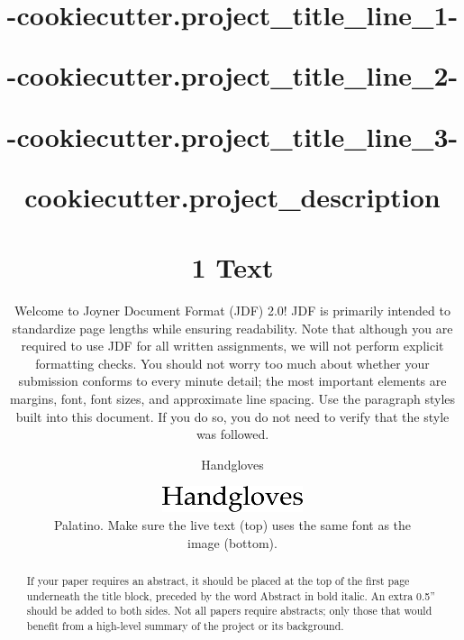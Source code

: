 

\title{
  {{-cookiecutter.project_title_line_1-}} \\

  {%
    {{-cookiecutter.project_title_line_2-}} \\
  {%

  {%
    {{-cookiecutter.project_title_line_3-}} \\
  {%
  }



\maketitle
\thispagestyle{fancy}

{{cookiecutter.project_description}}

% 

\begin{abstract}
If your paper requires an abstract, it should be placed at the top of the first page underneath the title block, preceded by the word Abstract in bold italic. An extra 0.5'' should be added to both sides. Not all papers require abstracts; only those that would benefit from a high-level summary of the project or its background.
\end{abstract}

\section*{1 Text}
Welcome to Joyner Document Format (JDF) 2.0! JDF is primarily intended to standardize page lengths while ensuring readability. Note that although you are required to use JDF for all written assignments, we will not perform explicit formatting checks. You should not worry too much about whether your submission conforms to every minute detail; the most important elements are margins, font, font sizes, and approximate line spacing. Use the paragraph styles built into this document. If you do so, you do not need to verify that the style was followed.

\huge\centerline{Handgloves}\normalsize

\begin{figure}[H]
  \centering
  \includegraphics[scale=0.7]{figs/example-image1}
  \caption{Palatino. Make sure the live text (top) uses the same font as the image (bottom).}
  \label{fig::1}
\end{figure}

}}}}
